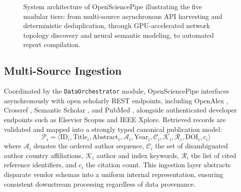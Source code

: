 \documentclass[preprint,12pt]{elsarticle}
\begin{document}
\begin{figure}[H]
{%
}
\caption{System architecture of OpenSciencePipe illustrating the five modular tiers: from multi-source asynchronous API harvesting and deterministic deduplication, through GPU-accelerated network topology discovery and neural semantic modeling, to automated report compilation.}
\label{fig:architecture}
\end{figure}



\subsection{Multi-Source Ingestion}
Coordinated by the \texttt{DataOrchestrator} module, OpenSciencePipe interfaces asynchronously with open scholarly REST endpoints, including OpenAlex \cite{priem2022openalex}, Crossref \cite{hendricks2020crossref}, Semantic Scholar \cite{kinney2023semantic}, and PubMed \cite{sayers2022database}, alongside authenticated developer endpoints such as Elsevier Scopus and IEEE Xplore. Retrieved records are validated and mapped into a strongly typed canonical publication model:
\begin{equation}
\label{eq:data_model}
\mathcal{P}_i = \langle \text{ID}_i, \text{Title}_i, \text{Abstract}_i, \mathcal{A}_i, \text{Year}_i, \mathcal{C}_i, \mathcal{K}_i, \mathcal{R}_i, \text{DOI}_i, c_i \rangle
\end{equation}
where $\mathcal{A}_i$ denotes the ordered author sequence, $\mathcal{C}_i$ the set of disambiguated author country affiliations, $\mathcal{K}_i$ author and index keywords, $\mathcal{R}_i$ the list of cited reference identifiers, and $c_i$ the citation count. This ingestion layer abstracts disparate vendor schemas into a uniform internal representation, ensuring consistent downstream processing regardless of data provenance.
\end{document}
